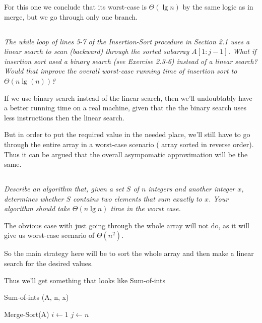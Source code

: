 \documentclass[11pt,oneside,titlepage]{book}
\begin{document}
For this one we conclude that its worst-case is $\Theta(\lg n)$ by the same logic as in merge,
but we go through only one branch.

\subsection{}

\textit{The while loop of lines 5-7 of the Insertion-Sort procedure in Section 2.1
  uses a linear search to scan (backward) through the sorted subarray $A[1:j - 1]$.
  What if insertion sort used a binary search (see Exercise 2.3-6) instead of a linear
  search? Would that improve the overall worst-case running time of insertion sort
  to $\Theta(n \lg(n))$?}

If we use binary search instead of the linear search, then we'll undoubtably  have a
better running time on a real machine, given that the the binary search uses less instructions
then the linear search.

But in order to put the required value in the needed place, we'll still have to go
through the entire array in a worst-case scenario ( array sorted in reverse order). Thus
it can be argued that the overall asympomatic approximation will be the same.

\subsection{}

\textit{Describe an algorithm that, given a set $S$ of $n$ integers and another integer $x$,
determines whether $S$ contains two elements that sum exactly to $x$. Your algorithm
should take $\Theta (n \lg n)$ time in the worst case.}

The obvious case with just going through the whole array will not do, as it will give us
worst-case scenario of $\Theta(n^2)$.

So the main strategy here will be to sort the whole array and then make a linear search for
the desired values.

Thus we'll get something that looks like Sum-of-ints
\begin{function}
  \caption{Sum-of-ints (A, n, x)}
  Merge-Sort(A) \;
  $i \leftarrow 1$\;
  $j \leftarrow n$\;
  
\end{function}
\end{document}
